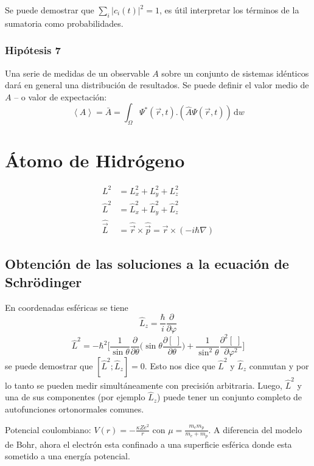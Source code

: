 \documentclass[10pt,twocolumn,titlepage]{article}
\newcommand{\spartial}[2]{\frac{\partial #1}{\partial #2}}
\newcommand{\dpartial}[2]{\frac{\partial^2 #1}{\partial #2^2}}
\newcommand{\di}{\,\textrm{d}}
\begin{document}
Se puede demostrar que $\sum_i |c_i(t)|^2=1$, es útil interpretar los términos de la sumatoria como probabilidades.
\subsubsection*{Hipótesis 7}
Una serie de medidas de un observable $A$ sobre un conjunto de sistemas idénticos dará en general una distribución de resultados. Se puede definir el valor medio de $A$ -- o valor de expectación:
$$\left< A \right> =\bar{A}=\int_\Omega \Psi^*( \vec{r},t).\left(\hat{A}\Psi(\vec{r},t)\right)\di w$$



\section{Átomo de Hidrógeno}
\begin{align*}
L^2&=L_x^2+L_y^2+L_z^2\\
\hat{L}^2&=\hat{L}_x^2+\hat{L}_y^2 +\hat{L}_z^2 \\
\hat{\vec{L}}&=\hat{\vec{r}}\times \hat{\vec{p}}=\vec{r}\times(-i\hbar\nabla)
\end{align*}
\subsection{Obtención de las soluciones a la ecuación de Schrödinger}
En coordenadas esféricas se tiene
$$\hat{L}_z=\frac{\hbar}{i}\spartial{}{\varphi}$$
$$\hat{L}^2 = -\hbar^2\Bigg[  \frac{1}{\sin\theta}\spartial{ }{\theta} \bigg( \sin\theta \spartial{[\;]}{\theta}\bigg)+\frac{1}{\sin^2\theta}\dpartial{[\;]}{\varphi}  \Bigg]$$
se puede demostrar que $[\hat{L}^2;\hat{L}_z]=0$. Esto nos dice que $\hat{L}^2$ y $\hat{L}_z$ conmutan y por lo tanto se pueden medir simultáneamente con precisión arbitraria.
Luego, $\hat{L}^2$ y una de sus componentes (por ejemplo $\hat{L}_z$) puede tener un conjunto completo de autofunciones ortonormales comunes.

Potencial coulombiano: $V(r)=-\frac{\kappa Z e^2}{r}$ 
con $\mu=\frac{m_em_p}{m_e+m_p}$. A diferencia del modelo de Bohr, ahora el electrón esta confinado a una superficie esférica donde esta sometido a una energía potencial.
\end{document}
